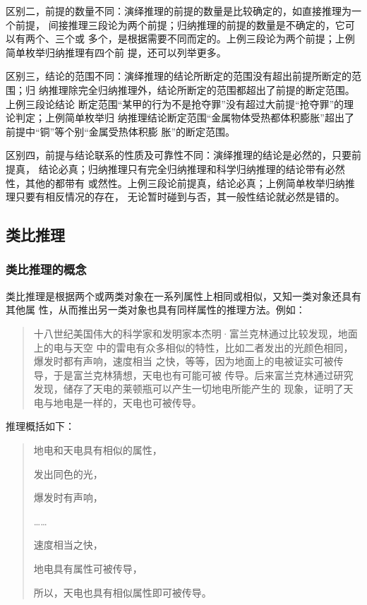 \documentclass[final,oneside]{ctexbook}
\newenvironment{equotation}{\begin{quotation}\kaishu}{\end{quotation}}
\begin{document}
区别二，前提的数量不同：演绎推理的前提的数量是比较确定的，如直接推理为一个前提，
间接推理三段论为两个前提；归纳推理的前提的数量是不确定的，它可以有两个、三个或
多个，是根据需要不同而定的。上例三段论为两个前提；上例简单枚举归纳推理有四个前
提，还可以列举更多。

区别三，结论的范围不同：演绎推理的结论所断定的范围没有超出前提所断定的范围；归
纳推理除完全归纳推理外，结论所断定的范围都超出了前提的断定范围。上例三段论结论
断定范围“某甲的行为不是抢夺罪”没有超过大前提“抢夺罪”的理论判定；上例简单枚举归
纳推理结论断定范围“金属物体受热都体积膨胀”超出了前提中“铜”等个别“金属受热体积膨
胀”的断定范围。

区别四，前提与结论联系的性质及可靠性不同：演绎推理的结论是必然的，只要前提真，
结论必真；归纳推理只有完全归纳推理和科学归纳推理的结论带有必然性，其他的都带有
或然性。上例三段论前提真，结论必真；上例简单枚举归纳推理只要有相反情况的存在，
无论暂时碰到与否，其一般性结论就必然是错的。

\subsection{类比推理}

\subsubsection{类比推理的概念}

类比推理是根据两个或两类对象在一系列属性上相同或相似，又知一类对象还具有其他属
性，从而推出另一类对象也具有同样属性的推理方法。例如：
\begin{equotation}
  十八世纪美国伟大的科学家和发明家本杰明·富兰克林通过比较发现，地面上的电与天空
  中的雷电有众多相似的特性，比如二者发出的光颜色相同，爆发时都有声响，速度相当
  之快，等等，因为地面上的电被证实可被传导，于是富兰克林猜想，天电也有可能可被
  传导。后来富兰克林通过研究发现，储存了天电的莱顿瓶可以产生一切地电所能产生的
  现象，证明了天电与地电是一样的，天电也可被传导。
\end{equotation}
推理概括如下：
\begin{equotation}
  地电和天电具有相似的属性，

  发出同色的光，

  爆发时有声响，

  ……

  速度相当之快，

  地电具有属性可被传导，

  所以，天电也具有相似属性即可被传导。
\end{equotation}
\end{document}
